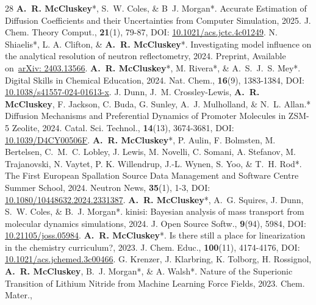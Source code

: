 \begin{paperenumerate}{28}
   \cvpaper
    {\textbf{A.~R. McCluskey}*, S.~W. Coles, \& B~J. Morgan*.}
    {Accurate Estimation of Diffusion Coefficients and their Uncertainties from Computer Simulation,}
    {2025.}
    {J. Chem. Theory Comput.,}
    {\textbf{21}(1), 79-87,}
    {DOI: \href{https://doi.org/10.1021/acs.jctc.4c01249}{10.1021/acs.jctc.4c01249}.}
  \cvpaper
    {N. Shiaelis*, L. A. Clifton, \& \textbf{A.~R. McCluskey}*.}
    {Investigating model influence on the analytical resolution of neutron reflectometry,}
    {2024.}
    {Preprint,}
    {}
    {Available on~\href{https://arxiv.org/abs/2403.13566}{arXiv: 2403.13566}.}
  \cvpaper
    {\textbf{A.~R. McCluskey}*, M. Rivera*, \& A.~S.~J.~S. Mey*.}
    {Digital Skills in Chemical Education,}
    {2024.}
    {Nat. Chem.,}
    {\textbf{16}(9), 1383-1384,}
    {DOI: \href{https://doi.org/10.1038/s41557-024-01613-x}{10.1038/s41557-024-01613-x}.}
  \cvpaper
    {J. Dunn, J.~M. Crossley-Lewis, \textbf{A.~R. McCluskey}, F. Jackson, C. Buda, G. Sunley, A.~J. Mulholland, \& N.~L. Allan.*}
    {Diffusion Mechanisms and Preferential Dynamics of Promoter Molecules in ZSM-5 Zeolite,}
    {2024.}
    {Catal. Sci. Technol.,}
    {\textbf{14}(13), 3674-3681,}
    {DOI: \href{https://doi.org/10.1039/D4CY00506F}{10.1039/D4CY00506F}.}
  \cvpaper
    {\textbf{A.~R. McCluskey}*, P. Aulin, F. Bolmsten, M. Bertelsen, C.~M.~C. Lobley, J. Lewis, M. Novelli, C. Somani, A. Stefanov, M. Trajanovski, N. Vaytet, P. K. Willendrup, J.-L. Wynen, S. Yoo, \& T.~H. Rod*.}
    {The First European Spallation Source Data Management and Software Centre Summer School,}
    {2024.}
    {Neutron News,}
    {\textbf{35}(1), 1-3,}
    {DOI: \href{https://doi.org/10.1080/10448632.2024.2331387}{10.1080/10448632.2024.2331387}.}
  \cvpaper
    {\textbf{A.~R. McCluskey}*, A.~G. Squires, J. Dunn, S.~W. Coles, \& B.~J. Morgan*.}
    {kinisi: Bayesian analysis of mass transport from molecular dynamics simulations,}
    {2024.}
    {J. Open Source Softw.,}
    {\textbf{9}(94), 5984,}
    {DOI: \href{https://doi.org/10.21105/joss.05984}{10.21105/joss.05984}.}
   \cvpaper
    {\textbf{A.~R. McCluskey}*.}
    {Is there still a place for linearization in the chemistry curriculum?,}
    {2023.}
    {J. Chem. Educ.,}
    {\textbf{100}(11), 4174-4176,}
    {DOI: \href{https://doi.org/10.1021/acs.jchemed.3c00466}{10.1021/acs.jchemed.3c00466}.}
  \cvpaper
    {G. Krenzer, J. Klarbring, K. Tolborg, H. Rossignol, \textbf{A.~R. McCluskey}, B.~J. Morgan*, \& A. Walsh*.}
    {Nature of the Superionic Transition of Lithium Nitride from Machine Learning Force Fields,}
    {2023.}
    {Chem. Mater.,}

\end{paperenumerate}
